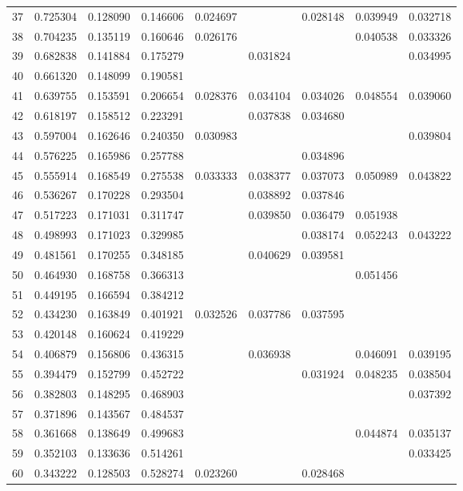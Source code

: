 \documentclass{elsarticle}
\begin{document}
\begin{center}
\begin{longtable}{|c|ccc|cccc|c|}
  37 & 0.725304 & 0.128090 & 0.146606 & 0.024697 &  & 0.028148 & 0.039949 & 0.032718 \\
  38 & 0.704235 & 0.135119 & 0.160646 & 0.026176 &  &  & 0.040538 & 0.033326 \\
  39 & 0.682838 & 0.141884 & 0.175279 &  & 0.031824 &  &  & 0.034995 \\
  40 & 0.661320 & 0.148099 & 0.190581 &  &  &  &  &  \\
  41 & 0.639755 & 0.153591 & 0.206654 & 0.028376 & 0.034104 & 0.034026 & 0.048554 & 0.039060 \\
  42 & 0.618197 & 0.158512 & 0.223291 &  & 0.037838 & 0.034680 &  &  \\
  43 & 0.597004 & 0.162646 & 0.240350 & 0.030983 &  &  &  & 0.039804 \\
  44 & 0.576225 & 0.165986 & 0.257788 &  &  & 0.034896 &  &  \\
  45 & 0.555914 & 0.168549 & 0.275538 & 0.033333 & 0.038377 & 0.037073 & 0.050989 & 0.043822 \\
  46 & 0.536267 & 0.170228 & 0.293504 &  & 0.038892 & 0.037846 &  &  \\
  47 & 0.517223 & 0.171031 & 0.311747 &  & 0.039850 & 0.036479 & 0.051938 &  \\
  48 & 0.498993 & 0.171023 & 0.329985 &  &  & 0.038174 & 0.052243 & 0.043222 \\
  49 & 0.481561 & 0.170255 & 0.348185 &  & 0.040629 & 0.039581 &  &  \\
  50 & 0.464930 & 0.168758 & 0.366313 &  &  &  & 0.051456 &  \\
  51 & 0.449195 & 0.166594 & 0.384212 &  &  &  &  &  \\
  52 & 0.434230 & 0.163849 & 0.401921 & 0.032526 & 0.037786 & 0.037595 &  &  \\
  53 & 0.420148 & 0.160624 & 0.419229 &  &  &  &  &  \\
  54 & 0.406879 & 0.156806 & 0.436315 &  & 0.036938 &  & 0.046091 & 0.039195 \\
  55 & 0.394479 & 0.152799 & 0.452722 &  &  & 0.031924 & 0.048235 & 0.038504 \\
  56 & 0.382803 & 0.148295 & 0.468903 &  &  &  &  & 0.037392 \\
  57 & 0.371896 & 0.143567 & 0.484537 &  &  &  &  &  \\
  58 & 0.361668 & 0.138649 & 0.499683 &  &  &  & 0.044874 & 0.035137 \\
  59 & 0.352103 & 0.133636 & 0.514261 &  &  &  &  & 0.033425 \\
  60 & 0.343222 & 0.128503 & 0.528274 & 0.023260 &  & 0.028468 &  &  \\

\end{longtable}
\end{center}
\end{document}
